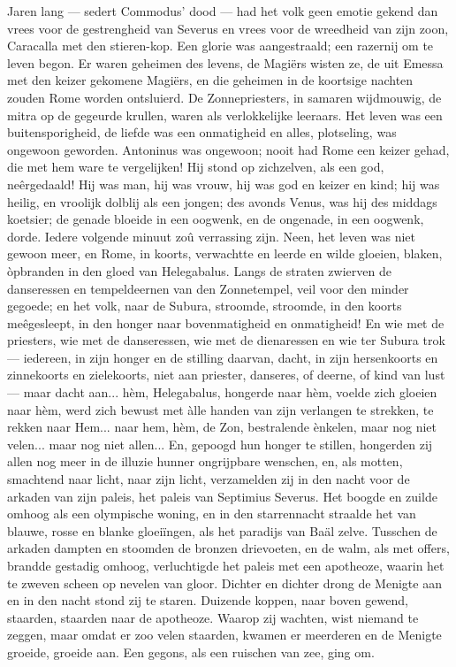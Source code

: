 \documentclass[a4paper, 12pt, oneside, dutch]{article}
\begin{document}
Jaren lang --- sedert Commodus' dood --- had het volk geen emotie gekend dan vrees voor de gestrengheid van Severus en vrees voor de wreedheid van zijn zoon, Caracalla met den stieren-kop. Een glorie was aangestraald; een razernij om te leven begon. Er waren geheimen des levens, de Magiërs wisten ze, de uit Emessa met den keizer gekomene Magiërs, en die geheimen in de koortsige nachten zouden Rome worden ontsluierd. De Zonnepriesters, in samaren wijdmouwig, de mitra op de gegeurde krullen, waren als verlokkelijke leeraars. Het leven was een buitensporigheid, de liefde was een onmatigheid en alles, plotseling, was ongewoon geworden. Antoninus was ongewoon; nooit had Rome een keizer gehad, die met hem ware te vergelijken! Hij stond op zichzelven, als een god, neêrgedaald! Hij was man, hij was vrouw, hij was god en keizer en kind; hij was heilig, en vroolijk dolblij als een jongen; des avonds Venus, was hij des middags koetsier; de genade bloeide in een oogwenk, en de ongenade, in een oogwenk, dorde. Iedere volgende minuut zoû verrassing zijn. Neen, het leven was niet gewoon meer, en Rome, in koorts, verwachtte en leerde en wilde gloeien, blaken, òpbranden in den gloed van Helegabalus. Langs de straten zwierven de danseressen en tempeldeernen van den Zonnetempel, veil voor den minder gegoede; en het volk, naar de Subura, stroomde, stroomde, in den koorts meêgesleept, in den honger naar bovenmatigheid en onmatigheid! En wie met de priesters, wie met de danseressen, wie met de dienaressen en wie ter Subura trok --- iedereen, in zijn honger en de stilling daarvan, dacht, in zijn hersenkoorts en zinnekoorts en zielekoorts, niet aan priester, danseres, of deerne, of kind van lust --- maar dacht aan... hèm, Helegabalus, hongerde naar hèm, voelde zich gloeien naar hèm, werd zich bewust met àlle handen van zijn verlangen te strekken, te rekken naar Hem... naar hem, hèm, de Zon, bestralende ènkelen, maar nog niet velen... maar nog niet allen... En, gepoogd hun honger te stillen, hongerden zij allen nog meer in de illuzie hunner ongrijpbare wenschen, en, als motten, smachtend naar licht, naar zijn licht, verzamelden zij in den nacht voor de arkaden van zijn paleis, het paleis van Septimius Severus. Het boogde en zuilde omhoog als een olympische woning, en in den starrennacht straalde het van blauwe, rosse en blanke gloeiïngen, als het paradijs van Baäl zelve. Tusschen de arkaden dampten en stoomden de bronzen drievoeten, en de walm, als met offers, brandde gestadig omhoog, verluchtigde het paleis met een apotheoze, waarin het te zweven scheen op nevelen van gloor. Dichter en dichter drong de Menigte aan en in den nacht stond zij te staren. Duizende koppen, naar boven gewend, staarden, staarden naar de apotheoze. Waarop zij wachten, wist niemand te zeggen, maar omdat er zoo velen staarden, kwamen er meerderen en de Menigte groeide, groeide aan. Een gegons, als een ruischen van zee, ging om.
\end{document}
